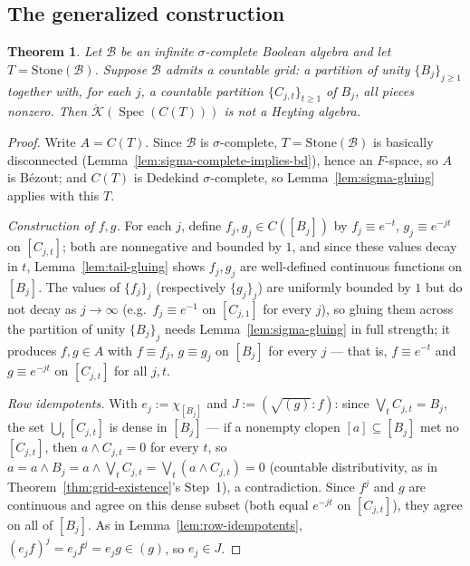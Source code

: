 \documentclass{amsart}
\newtheorem{theorem}{Theorem}
\theoremstyle{definition}
\theoremstyle{remark}
\newcommand{\Spec}[1]{\operatorname{Spec}\left(#1\right)}
\newcommand{\cont}[1]{C\left(#1\right)}
\newcommand{\KOp}[1]{\mathring{\mathcal{K}}\left(#1\right)}
\begin{document}
\subsection{The generalized construction}

\begin{theorem}\label{claim:beyond-betaD}
Let $\mathcal B$ be an infinite $\sigma$-complete Boolean algebra and let
$T=\mathrm{Stone}(\mathcal B)$. Suppose $\mathcal B$ admits a countable
grid: a partition of unity $\{B_j\}_{j\geq1}$ together with, for each
$j$, a countable partition $\{C_{j,t}\}_{t\geq1}$ of $B_j$, all pieces
nonzero. Then $\KOp{\Spec{\cont{T}}}$ is not a Heyting algebra.
\end{theorem}

\begin{proof}
Write $A=\cont{T}$. Since $\mathcal B$ is $\sigma$-complete,
$T=\mathrm{Stone}(\mathcal B)$ is basically disconnected
(Lemma~\ref{lem:sigma-complete-implies-bd}), hence an $F$-space, so $A$
is Bézout; and $\cont{T}$ is Dedekind $\sigma$-complete, so
Lemma~\ref{lem:sigma-gluing} applies with this $T$.

\emph{Construction of $f,g$.} For each $j$, define
$f_j,g_j\in\cont{[B_j]}$ by $f_j\equiv e^{-t}$, $g_j\equiv
e^{-jt}$ on $[C_{j,t}]$; both are nonnegative and bounded by $1$, and
since these values decay in $t$, Lemma~\ref{lem:tail-gluing} shows
$f_j,g_j$ are well-defined continuous functions on $[B_j]$. The values
of $\{f_j\}_j$ (respectively $\{g_j\}_j$) are uniformly bounded by $1$
but do not decay as $j\to\infty$ (e.g.\ $f_j\equiv e^{-1}$ on
$[C_{j,1}]$ for every $j$), so gluing them across the partition of
unity $\{B_j\}_j$ needs Lemma~\ref{lem:sigma-gluing} in full strength;
it produces $f,g\in A$ with $f\equiv f_j$, $g\equiv g_j$ on $[B_j]$ for
every $j$ --- that is, $f\equiv e^{-t}$ and $g\equiv e^{-jt}$ on
$[C_{j,t}]$ for all $j,t$.

\emph{Row idempotents.} With $e_j:=\chi_{[B_j]}$ and
$J:=(\sqrt{(g)}:f)$: since $\bigvee_tC_{j,t}=B_j$, the set
$\bigcup_t[C_{j,t}]$ is dense in $[B_j]$ --- if a nonempty clopen
$[a]\subseteq[B_j]$ met no $[C_{j,t}]$, then $a\wedge C_{j,t}=0$ for
every $t$, so $a=a\wedge B_j=a\wedge\bigvee_tC_{j,t}
=\bigvee_t(a\wedge C_{j,t})=0$ (countable distributivity, as in
Theorem~\ref{thm:grid-existence}'s Step~1), a contradiction. Since
$f^j$ and $g$ are continuous and agree on this dense subset (both equal
$e^{-jt}$ on $[C_{j,t}]$), they agree on all of $[B_j]$. As in
Lemma~\ref{lem:row-idempotents}, $(e_jf)^j=e_jf^j=e_jg\in(g)$, so
$e_j\in J$.


\end{proof}
\end{document}
